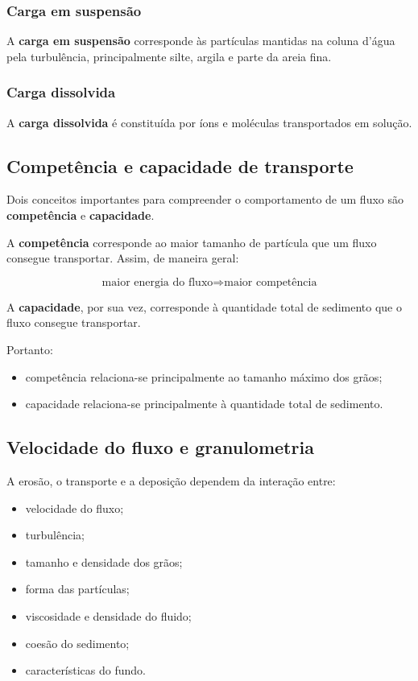 \subsubsection{Carga em suspensão}

A \textbf{carga em suspensão} corresponde às partículas mantidas na coluna
d'água pela turbulência, principalmente silte, argila e parte da areia fina.

\subsubsection{Carga dissolvida}

A \textbf{carga dissolvida} é constituída por íons e moléculas transportados em
solução.

\subsection{Competência e capacidade de transporte}

Dois conceitos importantes para compreender o comportamento de um fluxo são
\textbf{competência} e \textbf{capacidade}.

A \textbf{competência} corresponde ao maior tamanho de partícula que um fluxo
consegue transportar. Assim, de maneira geral:

\[
\text{maior energia do fluxo}
\Rightarrow
\text{maior competência}
\]

A \textbf{capacidade}, por sua vez, corresponde à quantidade total de sedimento
que o fluxo consegue transportar.

Portanto:

\begin{itemize}
    \item competência relaciona-se principalmente ao tamanho máximo dos grãos;
    \item capacidade relaciona-se principalmente à quantidade total de sedimento.
\end{itemize}

\subsection{Velocidade do fluxo e granulometria}

A erosão, o transporte e a deposição dependem da interação entre:

\begin{itemize}
    \item velocidade do fluxo;
    \item turbulência;
    \item tamanho e densidade dos grãos;
    \item forma das partículas;
    \item viscosidade e densidade do fluido;
    \item coesão do sedimento;
    \item características do fundo.
\end{itemize}

